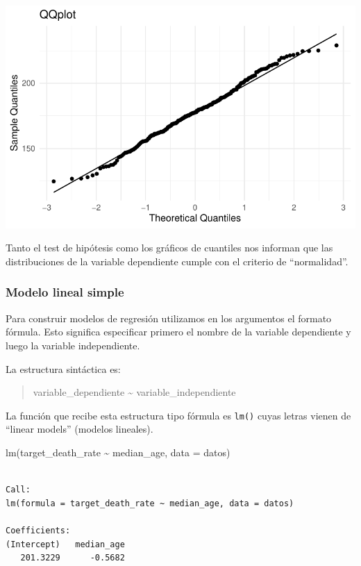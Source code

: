\documentclass[
  letterpaper,
  DIV=11,
  numbers=noendperiod]{scrartcl}
\newenvironment{Shaded}{\begin{snugshade}}{\end{snugshade}}
\newcommand{\AttributeTok}[1]{\textcolor[rgb]{0.40,0.45,0.13}{#1}}
\newcommand{\FunctionTok}[1]{\textcolor[rgb]{0.28,0.35,0.67}{#1}}
\newcommand{\NormalTok}[1]{\textcolor[rgb]{0.00,0.23,0.31}{#1}}
\newcommand{\SpecialCharTok}[1]{\textcolor[rgb]{0.37,0.37,0.37}{#1}}
\begin{document}
\begin{center}
\includegraphics{index_files/figure-pdf/unnamed-chunk-13-1.pdf}
\end{center}

Tanto el test de hipótesis como los gráficos de cuantiles nos informan
que las distribuciones de la variable dependiente cumple con el criterio
de ``normalidad''.

\subsubsection{Modelo lineal simple}\label{modelo-lineal-simple}

Para construir modelos de regresión utilizamos en los argumentos el
formato fórmula. Esto significa especificar primero el nombre de la
variable dependiente y luego la variable independiente.

La estructura sintáctica es:

\begin{quote}
variable\_dependiente \textasciitilde{} variable\_independiente
\end{quote}

La función que recibe esta estructura tipo fórmula es \texttt{lm()}
cuyas letras vienen de ``linear models'' (modelos lineales).

\begin{Shaded}
\begin{Highlighting}[]
\FunctionTok{lm}\NormalTok{(target\_death\_rate }\SpecialCharTok{\textasciitilde{}}\NormalTok{ median\_age, }\AttributeTok{data =}\NormalTok{ datos)}
\end{Highlighting}
\end{Shaded}

\begin{verbatim}

Call:
lm(formula = target_death_rate ~ median_age, data = datos)

Coefficients:
(Intercept)   median_age  
   201.3229      -0.5682  
\end{verbatim}
\end{document}
